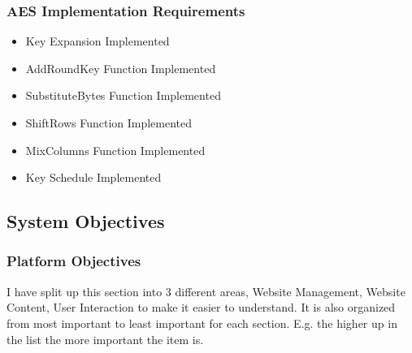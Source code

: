 \subsubsection{AES Implementation Requirements}

\begin{itemize}
\item{Key Expansion Implemented}
\item{AddRoundKey Function Implemented}
\item{SubstituteBytes Function Implemented}
\item{ShiftRows Function Implemented}
\item{MixColumns Function Implemented}
\item{Key Schedule Implemented}
\end{itemize}


\subsection{System Objectives}
\subsubsection{Platform Objectives}

I have split up this section into 3 different areas, Website Management, Website Content, User Interaction to make it easier to understand. It is also organized from most important to least important for each section. E.g. the higher up in the list the more important the item is. 

